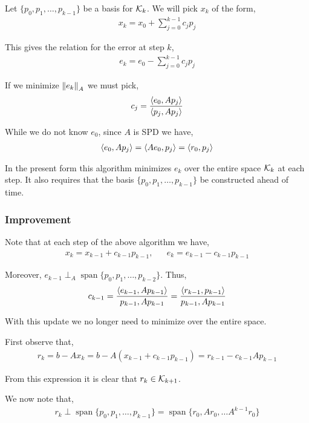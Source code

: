 \documentclass[12pt]{article}
\begin{document}
Let \( \{ p_0, p_1, \ldots, p_{k-1} \} \) be a basis for \( \mathcal{K}_k \). We will pick \( x_k \) of the form,
\begin{align*}
    x_k = x_0 + \sum_{j=0}^{k-1} c_j p_j
\end{align*}

This gives the relation for the error at step \( k \),
\begin{align*}
    e_k = e_0 - \sum_{j=0}^{k-1} c_j p_j
\end{align*}

If we minimize \( \left\lVert e_k\right\rVert_A \) we must pick,
\begin{align*}
    c_j = \dfrac{\left\langle e_0,Ap_j \right\rangle}{\left\langle p_j,Ap_j \right\rangle}
\end{align*}

While we do not know \( e_0 \), since \( A \) is SPD we have,
\begin{align*}
    \left\langle e_0,Ap_j \right\rangle = \left\langle Ae_0,p_j \right\rangle = \left\langle r_0,p_j \right\rangle
\end{align*}

In the present form this algorithm minimizes \( e_k \) over the entire space \( \mathcal{K}_k \) at each step. It also requires that the basis \( \{ p_0,p_1, \ldots, p_{k-1} \} \) be constructed ahead of time.

\subsubsection{Improvement}
Note that at each step of the above algorithm we have,
\begin{align*}
    x_k = x_{k-1} + c_{k-1}p_{k-1}, && e_k = e_{k-1} - c_{k-1}p_{k-1}
\end{align*}

Moreover, \( e_{k-1} \perp_A \operatorname{span}\{ p_0, p_1, \ldots, p_{k-2} \} \). Thus,
\begin{align*}
    c_{k-1} = \dfrac{\left\langle e_{k-1},Ap_{k-1} \right\rangle}{p_{k-1},Ap_{k-1}}
    = \dfrac{\left\langle r_{k-1},p_{k-1} \right\rangle}{p_{k-1},Ap_{k-1}}
\end{align*}

With this update we no longer need to minimize over the entire space.

First observe that,
\begin{align*}
    r_k = b-Ax_k = b-A(x_{k-1}+c_{k-1}p_{k-1}) = r_{k-1} -c_{k-1}Ap_{k-1}
\end{align*}

From this expression it is clear that \( r_k\in\mathcal{K}_{k+1} \).

We now note that,
\begin{align*}
    r_k \perp \operatorname{span}\{ p_0,p_1,\ldots, p_{k-1} \} = \operatorname{span}\{r_0,Ar_0, \ldots A^{k-1}r_0 \}
\end{align*}
\end{document}
